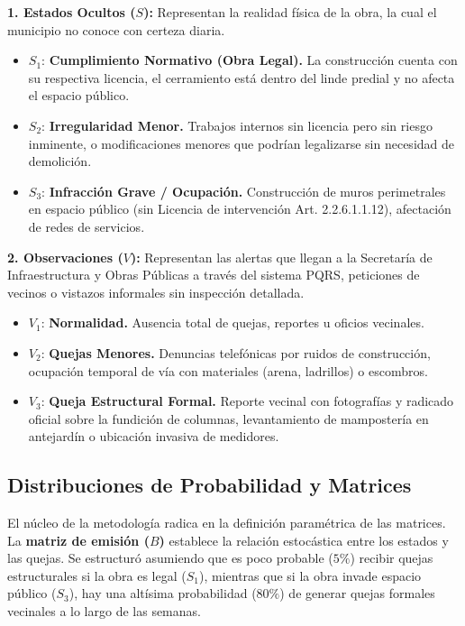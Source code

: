 \documentclass[12pt,letterpaper]{article}
\begin{document}
\textbf{1. Estados Ocultos ($S$):} Representan la realidad física de la obra, la cual el municipio no conoce con certeza diaria.
\begin{itemize}
    \item $S_1$: \textbf{Cumplimiento Normativo (Obra Legal).} La construcción cuenta con su respectiva licencia, el cerramiento está dentro del linde predial y no afecta el espacio público.
    \item $S_2$: \textbf{Irregularidad Menor.} Trabajos internos sin licencia pero sin riesgo inminente, o modificaciones menores que podrían legalizarse sin necesidad de demolición.
    \item $S_3$: \textbf{Infracción Grave / Ocupación.} Construcción de muros perimetrales en espacio público (sin Licencia de intervención Art. 2.2.6.1.1.12), afectación de redes de servicios. 
\end{itemize}

\textbf{2. Observaciones ($V$):} Representan las alertas que llegan a la Secretaría de Infraestructura y Obras Públicas a través del sistema PQRS, peticiones de vecinos o vistazos informales sin inspección detallada.
\begin{itemize}
    \item $V_1$: \textbf{Normalidad.} Ausencia total de quejas, reportes u oficios vecinales.
    \item $V_2$: \textbf{Quejas Menores.} Denuncias telefónicas por ruidos de construcción, ocupación temporal de vía con materiales (arena, ladrillos) o escombros.
    \item $V_3$: \textbf{Queja Estructural Formal.} Reporte vecinal con fotografías y radicado oficial sobre la fundición de columnas, levantamiento de mampostería en antejardín o ubicación invasiva de medidores.
\end{itemize}

\subsection{Distribuciones de Probabilidad y Matrices}
El núcleo de la metodología radica en la definición paramétrica de las matrices. La \textbf{matriz de emisión ($B$)} establece la relación estocástica entre los estados y las quejas. Se estructuró asumiendo que es poco probable ($5\%$) recibir quejas estructurales si la obra es legal ($S_1$), mientras que si la obra invade espacio público ($S_3$), hay una altísima probabilidad ($80\%$) de generar quejas formales vecinales a lo largo de las semanas.
\end{document}
